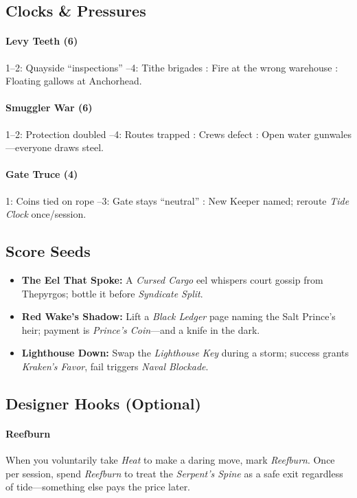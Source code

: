 \subsection*{Clocks \& Pressures}

\paragraph{Levy Teeth (6)}
1–2: Quayside “inspections” –4: Tithe brigades : Fire at the wrong warehouse : Floating gallows at Anchorhead.

\paragraph{Smuggler War (6)}
1–2: Protection doubled –4: Routes trapped : Crews defect : Open water gunwales—everyone draws steel.

\paragraph{Gate Truce (4)}
1: Coins tied on rope –3: Gate stays “neutral” : New Keeper named; reroute \emph{Tide Clock} once/session.

\subsection*{Score Seeds}

\begin{itemize}
\item \textbf{The Eel That Spoke:} A \emph{Cursed Cargo} eel whispers court gossip from Thepyrgos; bottle it before \emph{Syndicate Split}.
\item \textbf{Red Wake’s Shadow:} Lift a \emph{Black Ledger} page naming the Salt Prince’s heir; payment is \emph{Prince’s Coin}—and a knife in the dark.
\item \textbf{Lighthouse Down:} Swap the \emph{Lighthouse Key} during a storm; success grants \emph{Kraken’s Favor}, fail triggers \emph{Naval Blockade}.
\end{itemize}

\subsection*{Designer Hooks (Optional)}

\paragraph{Reefburn}
When you voluntarily take \emph{Heat} to make a daring move, mark \emph{Reefburn}. Once per session, spend \emph{Reefburn} to treat the \emph{Serpent’s Spine} as a safe exit regardless of tide—something else pays the price later.

